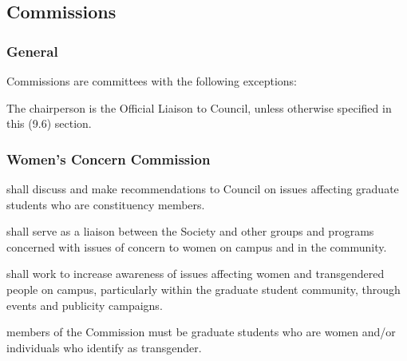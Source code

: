 \subsection{Commissions}
\subsubsection{General}
\begin{longenum}[ label*=\thesubsubsection.\arabic*., align=left]
	\item Commissions are committees with the following exceptions:
    \begin{longenum}[ label*=\arabic*., align=left]
		\item The chairperson is the Official Liaison to Council, unless otherwise specified in this (9.6) section.
	\end{longenum}
\end{longenum}
\subsubsection {Women's Concern Commission}
\begin{longenum}[ label*=\thesubsubsection.\arabic*., align=left]
	\item shall discuss and make recommendations to Council on issues affecting graduate students who are constituency members.
    \item shall serve as a liaison between the Society and other groups and programs concerned with issues of concern to women on campus and in the community.
    \item shall work to increase awareness of issues affecting women and transgendered people on campus, particularly within the graduate student community, through events and publicity campaigns.
    \item members of the Commission must be graduate students who are women and/or individuals who identify as transgender.

\end{longenum}

\newpage
